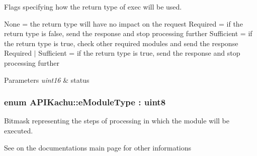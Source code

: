 Flags specifying how the return type of exec will be used. 

None = the return type will have no impact on the request Required = if the return type is false, send the response and stop processing further Sufficient = if the return type is true, check other required modules and send the response Required $\vert$ Sufficient = if the return type is true, send the response and stop processing further 
\begin{DoxyParams}{Parameters}
{\em uint16} & status \\
\hline
\end{DoxyParams}
\subsubsection[{\texorpdfstring{e\+Module\+Type}{eModuleType}}]{\setlength{\rightskip}{0pt plus 5cm}enum {\bf A\+P\+I\+Kachu\+::e\+Module\+Type} \+: uint8}\hypertarget{namespace_a_p_i_kachu_a114c3c51518a62812ae20c3554244347}{}\label{namespace_a_p_i_kachu_a114c3c51518a62812ae20c3554244347}


Bitmask representing the steps of processing in which the module will be executed. 

See on the documentation\textquotesingle{}s main page for other informations 